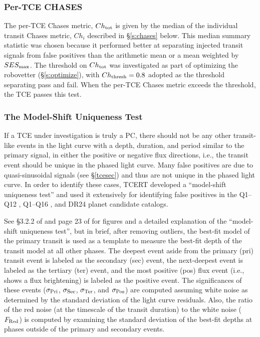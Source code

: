 \subsubsection{Per-TCE CHASES}
\label{s:tcechases}
The per-TCE Chases metric, $Ch_{\rm tot}$ is given by the median of the individual transit Chases metric, $Ch_{i}$ described in \S\ref{s:chases} below.  This median summary statistic was chosen because it performed better at separating injected transit signals from false positives than the arithmetic mean or a mean weighted by $SES_{\rm max}$. The threshold on $Ch_{\rm tot}$ was investigated as part of optimizing the robovetter (\S\ref{s:optimize}), with $Ch_{\rm thresh}=0.8$ adopted as the threshold separating pass and fail. When the per-TCE Chases metric exceeds the threshold, the TCE passes this test.


\subsubsection{The Model-Shift Uniqueness Test}
\label{s:ms}

If a TCE under investigation is truly a PC, there should not be any other transit-like events in the light curve with a depth, duration, and period similar to the primary signal, in either the positive or negative flux directions, i.e., the transit event should be unique in the phased light curve. Many false positives are due to quasi-sinusoidal signals (see \S\ref{tcesec}) and thus are not unique in the phased light curve. In order to identify these cases, TCERT developed a ``model-shift uniqueness test'' and used it extensively for identifying false positives in the Q1--Q12 \citep{Rowe2015a}, Q1--Q16 \citep{Mullally2015cat}, and DR24 \citep{Coughlin2016} planet candidate catalogs.

See \S3.2.2 of \citet{Rowe2015a} and page 23 of \citet{Coughlin2017vetProd} for figures and a detailed explanation of the ``model-shift uniqueness test'', but in brief, after removing outliers, the best-fit model of the primary transit is used as a template to measure the best-fit depth of the transit model at all other phases. The deepest event aside from the primary (pri) transit event is labeled as the secondary (sec) event, the next-deepest event is labeled as the tertiary (ter) event, and the most positive (pos) flux event (i.e., shows a flux brightening) is labeled as the positive event. The significances of these events ($\sigma_{\rm Pri}$, $\sigma_{\rm Sec}$, $\sigma_{\rm Ter}$, and $\sigma_{\rm Pos}$) are computed assuming white noise as determined by the standard deviation of the light curve residuals. Also, the ratio of the red noise (at the timescale of the transit duration) to the white noise ($F_{\rm Red}$) is computed by examining the standard deviation of the best-fit depths at phases outside of the primary and secondary events.  

